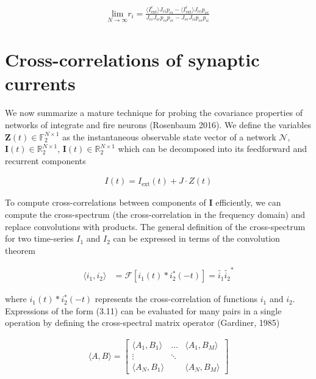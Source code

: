 \documentclass{ucetd}
\begin{document}
\begin{align}
\underset{N\rightarrow \infty}{\mathrm{lim}}r_{i} = \frac{\langle I_{\mathrm{ext}}^{e}\rangle J_{ei}p_{ei} - \langle I_{\mathrm{ext}}^{i}\rangle J_{ee}p_{ee}}{J_{ei}J_{ie}p_{ei}p_{ie} - J_{ee}J_{ii}p_{ee}p_{ii}}
\end{align}

\section{Cross-correlations of synaptic currents}

We now summarize a mature technique for probing the covariance properties of networks of integrate and fire neurons (Rosenbaum 2016). We define the variables $\mathbf{Z}(t)\in \mathbb{F}_{2}^{N\times 1}$ as the instantaneous observable state vector of a network $\mathcal{N}$, $\mathbf{I}(t)\in \mathbb{R}_{2}^{N\times 1}$, $\mathbf{I}(t)\in \mathbb{R}_{2}^{N\times 1}$ which can be decomposed into its feedforward and recurrent components

\begin{align}
I(t) = I_{\mathrm{ext}}(t) + J\cdot Z(t)
\end{align}

To compute cross-correlations between components of $\mathbf{I}$ efficiently, we can compute the cross-spectrum (the cross-correlation in the frequency domain) and replace convolutions with products. The general definition of the cross-spectrum for two time-series $I_{1}$ and $I_{2}$ can be expressed in terms of the convolution theorem

\begin{align}
\langle i_{1}, i_{2}\rangle &= \mathcal{F}\left[i_{1}(t)*i_{2}^{*}(-t)\right] = \tilde{i_{1}}\tilde{i_{2}}^{*}
\end{align}

where $i_{1}(t)*i_{2}^{*}(-t)$ represents the cross-correlation of functions $i_{1}$ and $i_{2}$. Expressions of the form (3.11) can be evaluated for many pairs in a single operation by defining the cross-spectral matrix operator (Gardiner, 1985)

\begin{align}
\langle A, B\rangle = \begin{bmatrix} 
    \langle A_{1}, B_{1}\rangle  & \dots & \langle A_{1}, B_{M}\rangle\\
    \vdots & \ddots & \\
    \langle A_{N}, B_{1}\rangle &        & \langle A_{N}, B_{M}\rangle
    \end{bmatrix}
\end{align}
\end{document}
